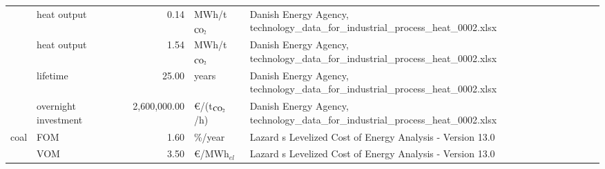 \begin{longtable}{p{4cm}p{4cm}rp{3cm}p{10cm}}
                      & heat output &         0.14 &            MWh/t$_{\ce{CO2}}$ &                                                                                                                                                                                                                                                    Danish Energy Agency, technology\_data\_for\_industrial\_process\_heat\_0002.xlsx \\
                      & heat output &         1.54 &            MWh/t$_{\ce{CO2}}$ &                                                                                                                                                                                                                                                    Danish Energy Agency, technology\_data\_for\_industrial\_process\_heat\_0002.xlsx \\
                      & lifetime &        25.00 &                         years &                                                                                                                                                                                                                                                    Danish Energy Agency, technology\_data\_for\_industrial\_process\_heat\_0002.xlsx \\
                      & overnight investment & 2,600,000.00 &      \euro/(t$_{\ce{CO2}}$/h) &                                                                                                                                                                                                                                                    Danish Energy Agency, technology\_data\_for\_industrial\_process\_heat\_0002.xlsx \\
coal & FOM &         1.60 &                       \%/year &                                                                                                                                                                                                                                                                            Lazard s Levelized Cost of Energy Analysis - Version 13.0 \\
                      & VOM &         3.50 &              \euro/MWh$_{el}$ &                                                                                                                                                                                                                                                                            Lazard s Levelized Cost of Energy Analysis - Version 13.0 \\

\end{longtable}
